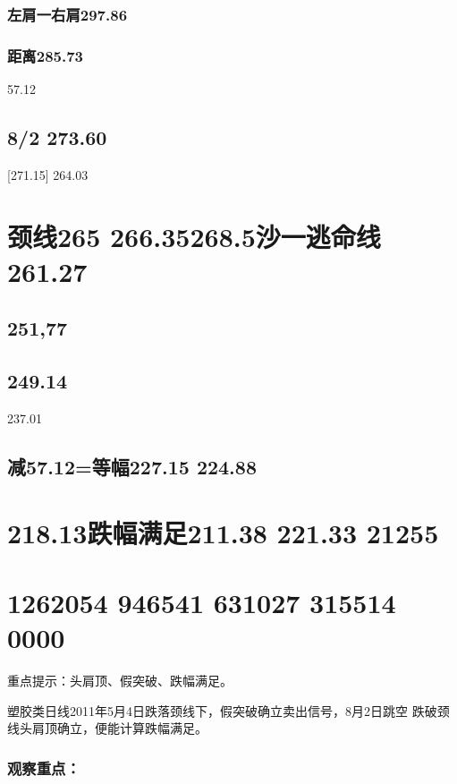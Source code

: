 \documentclass{article}
\begin{document}
\subsubsection{左肩一右肩297.86}

\subsubsection{距离285.73}

57.12

\subsection{8/2 273.60}

[271.15] 264.03

\section{颈线265 266.35268.5沙一逃命线261.27}

\subsection{251,77}

\subsection{249.14}

237.01

\subsection{减57.12=等幅227.15 224.88}

\section{218.13跌幅满足211.38 221.33 21255}

\section{1262054 946541 631027 315514 0000}

重点提示：头肩顶、假突破、跌幅满足。

塑胶类日线2011年5月4日跌落颈线下，假突破确立卖出信号，8月2日跳空 跌破颈线头肩顶确立，便能计算跌幅满足。

\subsubsection{观察重点：}
\end{document}
